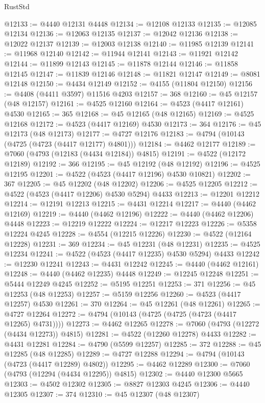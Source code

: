 \begin{lexlean}{RustStd}
\begin{coremodule}
{\begin{coremodule}
{{{{{{{{{{{{{{{{{{{{{{{{{{{{{{{{{{{{{{{{{{{{{{{{{{{{{{{{{{{{@12133 := @4440 @12131 @4448
@12134 := @12108 @12133
@12135 := @12085 @12134
@12136 := @12063 @12135
@12137 := @12042 @12136
@12138 := @12022 @12137
@12139 := @12003 @12138
@12140 := @11985 @12139
@12141 := @11968 @12140
@12142 := @11944 @12141
@12143 := @11921 @12142
@12144 := @11899 @12143
@12145 := @11878 @12144
@12146 := @11858 @12145
@12147 := @11839 @12146
@12148 := @11821 @12147
@12149 := @8081 @12148
@12150 := @4434 @12149
@12152 := @4155 (@11804 @12150)
@12156 := @4408 (@4411 @3597) @11516 @4203
@12157 := 368
@12160 := @45 @12157 (@48 @12157)
@12161 := @4525 @12160
@12164 := @4523 (@4417 @12161) @4530
@12165 := 365
@12168 := @45 @12165 (@48 @12165)
@12169 := @4525 @12168
@12172 := @4523 (@4417 @12169) @4530
@12173 := 364
@12176 := @45 @12173 (@48 @12173)
@12177 := @4727 @12176
@12183 := @4794 (@10143 (@4725 (@4723 (@4417 @12177) @4801)))
@12184 := @4462 @12177
@12189 := @7060 (@4793 (@12183 (@4434 @12184)) @4815)
@12191 := @4522 (@12172 @12189)
@12192 := 366
@12195 := @45 @12192 (@48 @12192)
@12196 := @4525 @12195
@12201 := @4522 (@4523 (@4417 @12196) @4530 @10821)
@12202 := 367
@12205 := @45 @12202 (@48 @12202)
@12206 := @4525 @12205
@12212 := @4522 (@4523 (@4417 @12206) @4530 @5294) @4433
@12213 := @12201 @12212
@12214 := @12191 @12213
@12215 := @4431 @12214
@12217 := @4440 (@4462 @12169)
@12219 := @4440 (@4462 @12196)
@12222 := @4440 (@4462 @12206) @4448
@12223 := @12219 @12222
@12224 := @12217 @12223
@12226 := @5358 @12224 @4245
@12228 := @4554 (@12215 @12226)
@12230 := @4522 (@12164 @12228)
@12231 := 369
@12234 := @45 @12231 (@48 @12231)
@12235 := @4525 @12234
@12241 := @4522 (@4523 (@4417 @12235) @4530 @5294) @4433
@12242 := @12230 @12241
@12243 := @4431 @12242
@12245 := @4440 (@4462 @12161)
@12248 := @4440 (@4462 @12235) @4448
@12249 := @12245 @12248
@12251 := @5444 @12249 @4245
@12252 := @5195 @12251
@12253 := 371
@12256 := @45 @12253 (@48 @12253)
@12257 := @5159 @12256
@12260 := @4523 (@4417 @12257) @4530
@12261 := 370
@12264 := @45 @12261 (@48 @12261)
@12265 := @4727 @12264
@12272 := @4794 (@10143 (@4725 (@4725 (@4723 (@4417 @12265) @4731))))
@12273 := @4462 @12265
@12278 := @7060 (@4793 (@12272 (@4434 @12273)) @4815)
@12281 := @4522 (@12260 @12278) @4433
@12282 := @4431 @12281
@12284 := @4790 (@5599 @12257)
@12285 := 372
@12288 := @45 @12285 (@48 @12285)
@12289 := @4727 @12288
@12294 := @4794 (@10143 (@4723 (@4417 @12289) @4802))
@12295 := @4462 @12289
@12300 := @7060 (@4793 (@12294 (@4434 @12295)) @4815)
@12302 := @4440 @12300 @5665
@12303 := @4502 @12302
@12305 := @8827 @12303 @4245
@12306 := @4440 @12305
@12307 := 374
@12310 := @45 @12307 (@48 @12307)
}}}}}}}}}}}}}}}}}}}}}}}}}}}}}}}}}}}}}}}}}}}}}}}}}}}}}}}}}}}}
\end{coremodule}}
\end{coremodule}
\end{lexlean}
